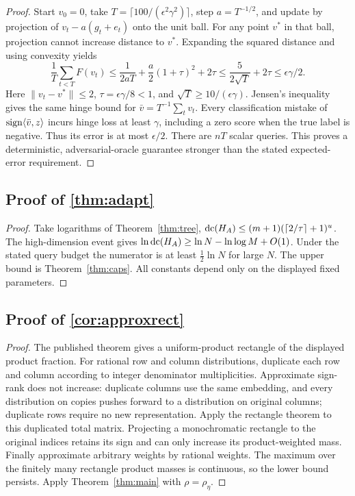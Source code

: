 \begin{proof}
Start $v_0=0$, take $T=\lceil100/(\epsilon^2\gamma^2)\rceil$, step $a=T^{-1/2}$, and update by projection of $v_t-a(g_t+e_t)$ onto the unit ball. For any point $v^*$ in that ball, projection cannot increase distance to $v^*$. Expanding the squared distance and using convexity yields
\[
 \frac1T\sum_{t<T}F(v_t)
 \le\frac1{2aT}+\frac a2(1+\tau)^2+2\tau
 \le\frac{5}{2\sqrt T}+2\tau
 \le\epsilon\gamma/2.
\]
Here $\|v_t-v^*\|\le2$, $\tau=\epsilon\gamma/8<1$, and $\sqrt T\ge10/(\epsilon\gamma)$. Jensen's inequality gives the same hinge bound for $\bar v=T^{-1}\sum_t v_t$. Every classification mistake of $\operatorname{sign}\langle\bar v,z\rangle$ incurs hinge loss at least $\gamma$, including a zero score when the true label is negative. Thus its error is at most $\epsilon/2$. There are $nT$ scalar queries. This proves a deterministic, adversarial-oracle guarantee stronger than the stated expected-error requirement.
\end{proof}

\subsection[Proof of result adapt]{Proof of \cref{thm:adapt}}\label{proof:adapt}
\begin{proof}
Take logarithms of Theorem~\ref{thm:tree}, $\operatorname{dc}(H_A)\le(m+1)(\lceil2/\tau\rceil+1)^u$. The high-dimension event gives $\ln\operatorname{dc}(H_A)\ge\ln N-\ln\log M+O(1)$. Under the stated query budget the numerator is at least $\tfrac12\ln N$ for large $N$. The upper bound is Theorem~\ref{thm:caps}. All constants depend only on the displayed fixed parameters.
\end{proof}

\subsection[Proof of result approxrect]{Proof of \cref{cor:approxrect}}\label{proof:approxrect}
\begin{proof}
The published theorem gives a uniform-product rectangle of the displayed product fraction. For rational row and column distributions, duplicate each row and column according to integer denominator multiplicities. Approximate sign-rank does not increase: duplicate columns use the same embedding, and every distribution on copies pushes forward to a distribution on original columns; duplicate rows require no new representation. Apply the rectangle theorem to this duplicated total matrix. Projecting a monochromatic rectangle to the original indices retains its sign and can only increase its product-weighted mass. Finally approximate arbitrary weights by rational weights. The maximum over the finitely many rectangle product masses is continuous, so the lower bound persists. Apply Theorem~\ref{thm:main} with $\rho=\rho_\eta$.
\end{proof}
